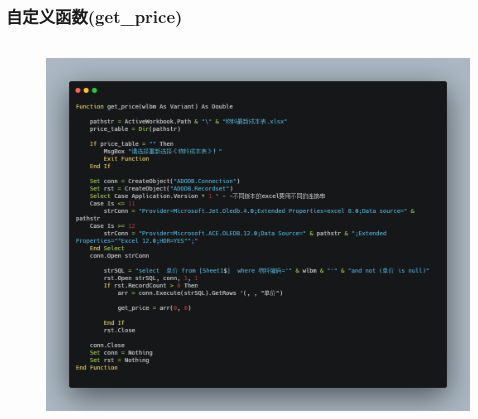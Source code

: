 \begin{frame}[fragile]
\frametitle{自定义函数(get\_price)}
	\begin{columns}
		\begin{column}{\textwidth}
		\begin{figure}		
			\includegraphics[height=\textheight]{figures/gprice.png}
		\end{figure}
		\end{column}
	\end{columns}
\end{frame}

